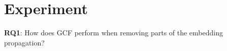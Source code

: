 \section{Experiment}
\textbf{RQ1}: How does GCF perform when removing parts of the embedding propagation?





